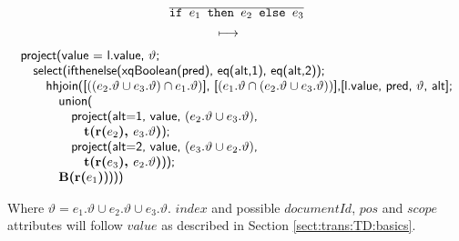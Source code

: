 \begin{equation}
\begin{array}{c}
\frac{}{\displaystyle \mbox{\texttt{if }}e_1\mbox{\texttt{ then }}e_2\mbox{\texttt{ else }}e_3} \\
\longmapsto \begin{array}{c}\mbox{\tiny } \\ \mbox{\tiny } \end{array} \\
\begin{array}{l}
\mbox{\textsf{project(value = l.value, }}\vartheta\mbox{\textsf{;}} \\ \quad
\mbox{\textsf{select(ifthenelse(xqBoolean(pred), eq(alt,1), eq(alt,2));}} \\ \quad \quad
\mbox{\textsf{hhjoin([}}((e_2.\vartheta \cup e_3.\vartheta)\cap e_1.\vartheta)\mbox{\textsf{],
[}}(e_1.\vartheta\cap (e_2.\vartheta\cup e_3.\vartheta))
\mbox{\textsf{],}} 
\mbox{\textsf{[l.value, pred, }}\vartheta\mbox{\textsf{,
alt];}}\\\quad\quad\quad \mbox{\textsf{union(}} \\ \quad\quad\quad\quad \mbox{\textsf{project(alt=1, value, }}(e_2.\vartheta \cup e_3.\vartheta)\mbox{\textsf{,}}\\\quad\quad\quad\quad\quad
\mbox{\textbf{t(r(}}e_2\mbox{\textbf{), }}e_3.\vartheta\mbox{\textbf{)}\textsf{);}} \\ \quad\quad\quad\quad
\mbox{\textsf{project(alt=2, value, }}(e_3.\vartheta\cup e_2.\vartheta)\mbox{\textsf{,}}\\\quad\quad\quad\quad\quad
\mbox{\textbf{t(r(}}e_3\mbox{\textbf{), }}e_2.\vartheta\mbox{\textbf{)}\textsf{));}}\\\quad\quad\quad
\mbox{\textbf{B(r(}}e_1\mbox{\textbf{)}\textsf{))))}}
\end{array}
\end{array}
\label{rule:trans:TD:conditional}
\end{equation}

Where $\vartheta = e_1.\vartheta \cup e_2.\vartheta \cup e_3.\vartheta$. $index$ and possible $documentId$, $pos$
and $scope$ attributes will follow $value$ as described in Section \ref{sect:trans:TD:basics}.

